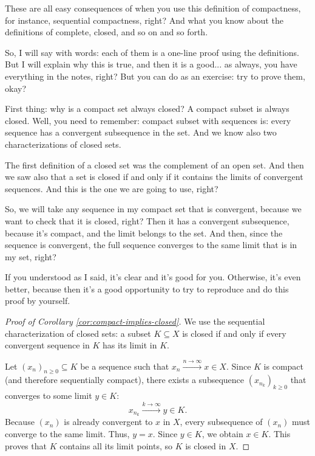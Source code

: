 \begin{speech}[00:23:12 - 00:25:12]
These are all easy consequences of when you use this definition of compactness, for instance, sequential compactness, right? And what you know about the definitions of complete, closed, and so on and so forth.

So, I will say with words: each of them is a one-line proof using the definitions. But I will explain why this is true, and then it is a good... as always, you have everything in the notes, right? But you can do as an exercise: try to prove them, okay?

First thing: why is a compact set always closed? A compact subset is always closed. Well, you need to remember: compact subset with sequences is: every sequence has a convergent subsequence in the set. And we know also two characterizations of closed sets.

The first definition of a closed set was the complement of an open set. And then we saw also that a set is closed if and only if it contains the limits of convergent sequences. And this is the one we are going to use, right?

So, we will take any sequence in my compact set that is convergent, because we want to check that it is closed, right? Then it has a convergent subsequence, because it's compact, and the limit belongs to the set. And then, since the sequence is convergent, the full sequence converges to the same limit that is in my set, right?

If you understood as I said, it's clear and it's good for you. Otherwise, it's even better, because then it's a good opportunity to try to reproduce and do this proof by yourself.
\end{speech}

\begin{content}
\begin{proof}[Proof of Corollary \ref{cor:compact-implies-closed}]
We use the sequential characterization of closed sets: a subset $K \subseteq X$ is closed if and only if every convergent sequence in $K$ has its limit in $K$.

Let $(x_n)_{n \ge 0} \subseteq K$ be a sequence such that $x_n \xrightarrow{n \to \infty} x \in X$.
Since $K$ is compact (and therefore sequentially compact), there exists a subsequence $(x_{n_k})_{k \ge 0}$ that converges to some limit $y \in K$:
\[
x_{n_k} \xrightarrow{k \to \infty} y \in K.
\]
Because $(x_n)$ is already convergent to $x$ in $X$, every subsequence of $(x_n)$ must converge to the same limit. Thus, $y = x$. Since $y \in K$, we obtain $x \in K$. This proves that $K$ contains all its limit points, so $K$ is closed in $X$.
\end{proof}
\end{content}

